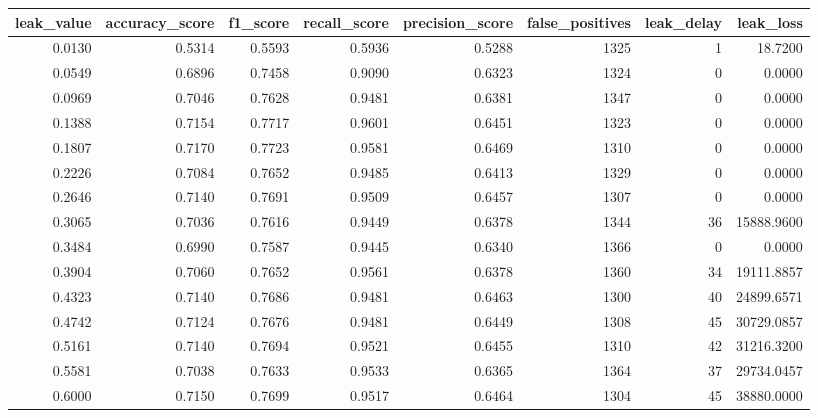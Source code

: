 \begin{tabular}{rrrrrrrr}
\toprule
leak\_value & accuracy\_score & f1\_score & recall\_score & precision\_score & false\_positives & leak\_delay & leak\_loss \\
\midrule
0.0130 & 0.5314 & 0.5593 & 0.5936 & 0.5288 & 1325 & 1 & 18.7200 \\
0.0549 & 0.6896 & 0.7458 & 0.9090 & 0.6323 & 1324 & 0 & 0.0000 \\
0.0969 & 0.7046 & 0.7628 & 0.9481 & 0.6381 & 1347 & 0 & 0.0000 \\
0.1388 & 0.7154 & 0.7717 & 0.9601 & 0.6451 & 1323 & 0 & 0.0000 \\
0.1807 & 0.7170 & 0.7723 & 0.9581 & 0.6469 & 1310 & 0 & 0.0000 \\
0.2226 & 0.7084 & 0.7652 & 0.9485 & 0.6413 & 1329 & 0 & 0.0000 \\
0.2646 & 0.7140 & 0.7691 & 0.9509 & 0.6457 & 1307 & 0 & 0.0000 \\
0.3065 & 0.7036 & 0.7616 & 0.9449 & 0.6378 & 1344 & 36 & 15888.9600 \\
0.3484 & 0.6990 & 0.7587 & 0.9445 & 0.6340 & 1366 & 0 & 0.0000 \\
0.3904 & 0.7060 & 0.7652 & 0.9561 & 0.6378 & 1360 & 34 & 19111.8857 \\
0.4323 & 0.7140 & 0.7686 & 0.9481 & 0.6463 & 1300 & 40 & 24899.6571 \\
0.4742 & 0.7124 & 0.7676 & 0.9481 & 0.6449 & 1308 & 45 & 30729.0857 \\
0.5161 & 0.7140 & 0.7694 & 0.9521 & 0.6455 & 1310 & 42 & 31216.3200 \\
0.5581 & 0.7038 & 0.7633 & 0.9533 & 0.6365 & 1364 & 37 & 29734.0457 \\
0.6000 & 0.7150 & 0.7699 & 0.9517 & 0.6464 & 1304 & 45 & 38880.0000 \\
\bottomrule
\end{tabular}
